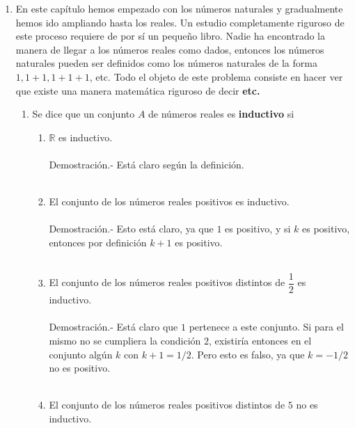 \begin{enumerate}
       \item En este capítulo hemos empezado con los números naturales y gradualmente hemos ido ampliando hasta los reales. Un estudio completamente riguroso de este proceso requiere de por sí un pequeño libro. Nadie ha encontrado la manera de llegar a los números reales como dados, entonces los números naturales pueden ser definidos como los números naturales de la forma $1,1+1,1+1+1$, etc. Todo el objeto de este problema consiste en hacer ver que existe una manera matemática riguroso de decir \textbf{etc.} 
          \begin{enumerate}[\bfseries (a)]
             \item Se dice que un conjunto $A$ de números reales es \textbf{inductivo} si
                \begin{enumerate}[\bfseries (i)]
                   \item $\mathbb{R}$ es inductivo.\\\\
                      Demostración.-\;  Está claro según la definición.\\\\
                   \item El conjunto de los números reales positivos es inductivo.\\\\
                      Demostración.-\; Esto está claro, ya que $1$ es positivo, y si $k$ es positivo, entonces por definición $k+1$ es positivo.\\\\
                   \item El conjunto de los números reales positivos distintos de $\dfrac{1}{2}$ es inductivo.\\\\
                      Demostración.-\; Está claro que $1$ pertenece a este conjunto. Si para el mismo no se cumpliera la condición $2$, existiría entonces en el conjunto algún $k$ con $k+1=1/2$. Pero esto es falso, ya que $k=-1/2$ no es positivo.\\\\
                   \item El conjunto de los números reales positivos distintos de $5$ no es inductivo.\\\\

\end{enumerate}
\end{enumerate}
\end{enumerate}

